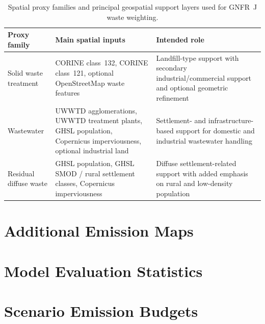 \begin{table}[htbp]
  \centering
  \caption{Spatial proxy families and principal geospatial support layers
    used for GNFR~J waste weighting.}
  \label{tab:waste_proxy_inputs}
  \footnotesize
  \begin{tabular}{p{3.4cm}p{4.5cm}p{4.6cm}}
    \hline
    Proxy family & Main spatial inputs & Intended role \\
    \hline
    Solid waste treatment &
    CORINE class~132, CORINE class~121, optional OpenStreetMap waste features &
    Landfill-type support with secondary industrial/commercial support and optional geometric refinement \\
    Wastewater &
    UWWTD agglomerations, UWWTD treatment plants, GHSL population, Copernicus imperviousness, optional industrial land &
    Settlement- and infrastructure-based support for domestic and industrial wastewater handling \\
    Residual diffuse waste &
    GHSL population, GHSL SMOD / rural settlement classes, Copernicus imperviousness &
    Diffuse settlement-related support with added emphasis on rural and low-density population \\
    \hline
  \end{tabular}
\end{table}

\section{Additional Emission Maps}
\label{app:emission_maps}


\section{Model Evaluation Statistics}
\label{app:eval_stats}


\section{Scenario Emission Budgets}
\label{app:scenario_budgets}

